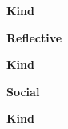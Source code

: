 \documentclass{book}
\providecommand{\ProjectDeepHeading}[2]{%
    \par\medskip\noindent\textbf{#2}\par\smallskip
}
\begin{document}

\ProjectDeepHeading{5}{Kind}

\ProjectDeepHeading{6}{Reflective}


% 

\ProjectDeepHeading{7}{Kind}


% 


% 


% 


% 

\ProjectDeepHeading{6}{Social}


% 

\ProjectDeepHeading{7}{Kind}


% 


% 

\end{document}

